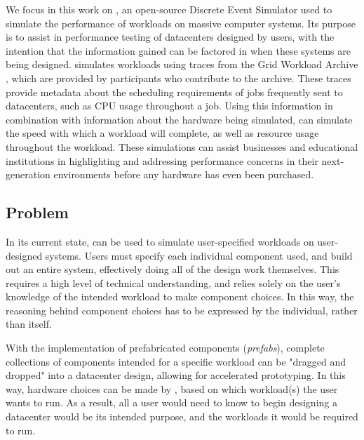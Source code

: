 \documentclass[11pt]{article}
\begin{document}
		We focus in this work on \opendc{}, an open-source Discrete Event Simulator used to simulate the performance of workloads on massive computer systems. 
		Its purpose is to assist in performance testing of datacenters designed by users, with the intention that the information gained can be factored in when these systems are being designed. 
		\opendc{} simulates workloads using traces from the Grid Workload Archive \cite{Iosup2008}, which are provided by participants who contribute to the archive. 
		These traces provide metadata about the scheduling requirements of jobs frequently sent to datacenters, such as CPU usage throughout a job. 
		Using this information in combination with information about the hardware being simulated, \opendc{} can simulate the speed with which a workload will complete, as well as resource usage throughout the workload. 
		These simulations can assist businesses and educational institutions in highlighting and addressing performance concerns in their next-generation environments before any hardware has even been purchased.
	
	\subsection{Problem}
		In its current state, \opendc{} can be used to simulate user-specified workloads on user-designed systems. 
		Users must specify each individual component used, and build out an entire system, effectively doing all of the design work themselves. 
		This requires a high level of technical understanding, and relies solely on the user's knowledge of the intended workload to make component choices. 
		In this way, the reasoning behind component choices has to be expressed by the individual, rather than \opendc{} itself.  

		With the implementation of prefabricated components (\textit{prefabs}), complete collections of components intended for a specific workload can be "dragged and dropped" into a datacenter design, allowing for accelerated prototyping.
		In this way, hardware choices can be made by \opendc{}, based on which workload(s) the user wants to run.
		As a result, all a user would need to know to begin designing a datacenter would be its intended purpose, and the workloads it would be required to run.
\end{document}
